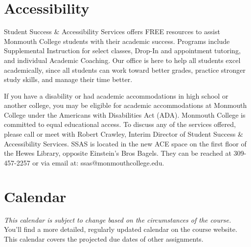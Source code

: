 \documentclass[10pt]{article}
\begin{document}
\section{Accessibility}

Student Success \& Accessibility Services offers FREE resources to assist Monmouth College students with their academic success. Programs include Supplemental Instruction for select classes, Drop-In and appointment tutoring, and individual Academic Coaching. Our office is here to help all students excel academically, since all students can work toward better grades, practice stronger study skills, and manage their time better.

If you have a disability or had academic accommodations in high school or another college, you may be eligible for academic accommodations at Monmouth College under the Americans with Disabilities Act (ADA). Monmouth College is committed to equal educational access. To discuss any of the services offered, please call or meet with Robert Crawley, Interim Director of Student Success \& Accessibility Services.  SSAS is located in the new ACE space on the first floor of the Hewes Library, opposite Einstein’s Bros Bagels. They can be reached at 309-457-2257 or via email at: ssas@monmouthcollege.edu.

\section{Calendar}

\textit{This calendar is subject to change based on the circumstances of the course.} You'll find a more detailed, regularly updated calendar on the course website. This calendar covers the projected due dates of other assignments.
\end{document}
